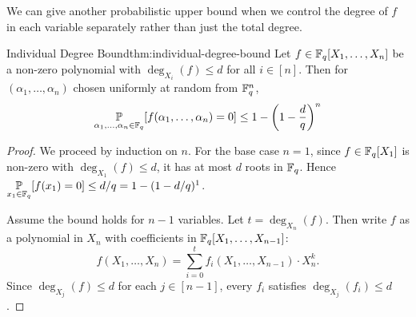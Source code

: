 We can give another probabilistic upper bound when we control the degree of $f$ in each variable separately rather than just the total degree.
\begin{Theorem}{Individual Degree Bound}{thm:individual-degree-bound}
  Let $f\in\mathbb{F}_q[X_1,\dots,X_n]$ be a non-zero polynomial with $\deg_{X_i}(f)\leq d$ for all $i\in[n]$. Then for $(\alpha_1,\dots,\alpha_n)$ chosen uniformly at random from $\mathbb{F}_q^n$,
  $$\Pr[\alpha_1,\dots,\alpha_n\in\bbF_q][f(\alpha_1,\dots,\alpha_n)=0]\leq 1-\lt(1-\frac{d}{q}\rt)^{n}$$
\end{Theorem}
\begin{proof}
  We proceed by induction on $n$. For the base case $n=1$, since $f\in\mathbb{F}_q[X_1]$ is non-zero with $\deg_{X_1}(f)\leq d$, it has at most $d$ roots in $\mathbb{F}_q$. Hence $\Pr[x_1\in\bbF_q][f(x_1)=0]\leq d/q=1-(1-d/q)^1$. 
  
  Assume the bound holds for $n-1$ variables. Let $t=\deg_{X_n}(f)$. Then write $f$ as a polynomial in $X_n$ with coefficients in $\mathbb{F}_q[X_1,\dots,X_{n-1}]$:
  $$f(X_1,\dots,X_n)=\sum_{i=0}^{t}f_i(X_1,\dots,X_{n-1})\cdot X_n^k.$$
  Since $\deg_{X_j}(f)\leq d$ for each $j\in[n-1]$, every $f_i$ satisfies $\deg_{X_j}(f_i)\leq d$.


\end{proof}
